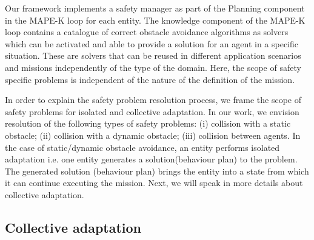 \documentclass[journal]{IEEEtran}
\theoremstyle{definition}
\begin{document}
Our framework implements a safety manager as part of the Planning component in the MAPE-K loop for each entity. The knowledge component of the MAPE-K loop contains a catalogue of correct obstacle avoidance algorithms as solvers which can be activated and able to provide a solution for an agent in a specific situation. These are solvers that can be reused in different application scenarios and missions independently of the type of the domain. Here,  the  scope  of safety specific  problems  is independent of the  nature  of  the definition of the mission.  

In  order to  explain  the safety  problem  resolution  process,  we  frame the  scope  of safety problems  for isolated  and  collective  adaptation. 
In our work, we envision resolution of the following types of safety problems: (i) collision with a static obstacle; (ii) collision with a  dynamic obstacle; (iii) collision between agents.  In the case of static/dynamic obstacle avoidance, an entity performs isolated adaptation i.e. one entity generates a solution(behaviour plan) to the problem. The  generated  solution  (behaviour  plan)  brings the entity  into  a  state  from  which  it  can  continue  executing the  mission. 
 Next,  we  will  speak  in  more  details  about  collective adaptation.

\subsection{Collective adaptation}







\end{document}
